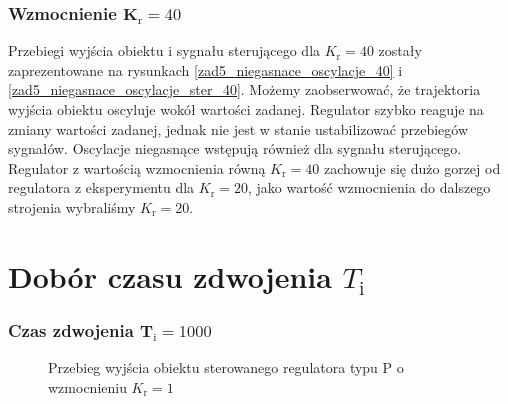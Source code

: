 \subsubsection{Wzmocnienie $\mathbf{K_{\mathrm{r}}} = \num{40}$} 
Przebiegi wyjścia obiektu i sygnału sterującego dla $K_{\mathrm{r}} = \num{40}$ zostały zaprezentowane na rysunkach \ref{zad5_niegasnace_oscylacje_40} i \ref{zad5_niegasnace_oscylacje_ster_40}. Możemy zaobserwować, że trajektoria wyjścia obiektu oscyluje wokół wartości zadanej. Regulator szybko reaguje na zmiany wartości zadanej, jednak nie jest w stanie ustabilizować przebiegów sygnałów. Oscylacje niegasnące wstępują również dla sygnału sterującego. Regulator z wartością wzmocnienia równą $K_{\mathrm{r}} = \num{40}$ zachowuje się dużo gorzej od regulatora z eksperymentu dla $K_{\mathrm{r}} = \num{20}$, jako wartość wzmocnienia do dalszego strojenia wybraliśmy $K_{\mathrm{r}} = \num{20}$.

\newpage
\section{Dobór czasu zdwojenia $T_{\mathrm{i}}$}
\subsubsection{Czas zdwojenia $\mathbf{T_{\mathrm{i}}} = \num{1000}$} 

\begin{figure}[t]
    \centering
    \caption{Przebieg wyjścia obiektu sterowanego regulatora typu P o wzmocnieniu $K_{\mathrm{r}} = \num{1}$}
    \label{zad5_niegasnace_oscylacje}
\end{figure}

